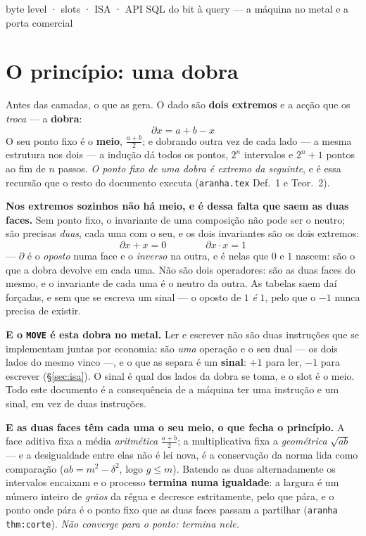 \documentclass[11pt,a4paper]{article}
\newcommand{\code}[1]{\texttt{\small #1}}
\providecommand{\interfacen}[1]{}  %
\begin{document}
\interfacen{6}  %
       {byte level · slots · ISA · API SQL}
       {do bit à query --- a máquina no metal e a porta comercial}
\maketitle

\section*{O princípio: uma dobra}

\noindent Antes das camadas, o que as gera. O dado são \textbf{dois extremos} e
a acção que os \emph{troca} --- a \textbf{dobra}:
\[
\boxed{\;\partial x = a+b-x\;}
\]
O seu ponto fixo é o \textbf{meio}, $\tfrac{a+b}{2}$; e dobrando outra vez de
cada lado --- a mesma estrutura nos dois --- a indução dá todos os pontos, $2^{n}$
intervalos e $2^{n}+1$ pontos ao fim de $n$ passos. \emph{O ponto fixo de uma
dobra é extremo da seguinte}, e é essa recursão que o resto do documento
executa (\code{aranha.tex} Def.~1 e Teor.~2).

\medskip\noindent\textbf{Nos extremos sozinhos não há meio, e é dessa falta que
saem as duas faces.} Sem ponto fixo, o invariante de uma composição não pode
ser o neutro; são precisas \emph{duas}, cada uma com o seu, e os dois
invariantes são os dois extremos:
\[
\boxed{\;
\partial x + x = 0
\qquad\qquad
\partial x \cdot x = 1
\;}
\]
--- $\partial$ é o \emph{oposto} numa face e o \emph{inverso} na outra, e é
nelas que $0$ e $1$ nascem: são o que a dobra devolve em cada uma. Não são dois
operadores: são as duas faces do mesmo, e o invariante de cada uma é o neutro da
outra. As tabelas saem daí forçadas, e sem que se escreva um sinal --- o oposto
de $1$ \emph{é} $1$, pelo que o $-1$ nunca precisa de existir.

\medskip\noindent\textbf{E o \code{MOVE} é esta dobra no metal.} Ler e escrever
não são duas instruções que se implementam juntas por economia: são \emph{uma}
operação e o seu dual --- os dois lados do mesmo vinco ---, e o que as separa é
um \textbf{sinal}: $+1$ para ler, $-1$ para escrever (\S\ref{sec:isa}). O sinal
é qual dos lados da dobra se toma, e o slot é o meio. Todo este documento é a
consequência de a máquina ter uma instrução e um sinal, em vez de duas
instruções.

\medskip\noindent\textbf{E as duas faces têm cada uma o seu meio, o que fecha o
princípio.} A face aditiva fixa a média \emph{aritmética} $\tfrac{a+b}{2}$; a
multiplicativa fixa a \emph{geométrica} $\sqrt{ab}$ --- e a desigualdade entre
elas não é lei nova, é a conservação da norma lida como comparação
($ab=m^{2}-\delta^{2}$, logo $g\le m$). Batendo as duas alternadamente os
intervalos encaixam e o processo \textbf{termina numa igualdade}: a largura é um
número inteiro de \emph{grãos} da régua e decresce estritamente, pelo que pára,
e o ponto onde pára é o ponto fixo que as duas faces passam a partilhar
(\code{aranha thm:corte}). \emph{Não converge para o ponto: termina nele.}
\end{document}
